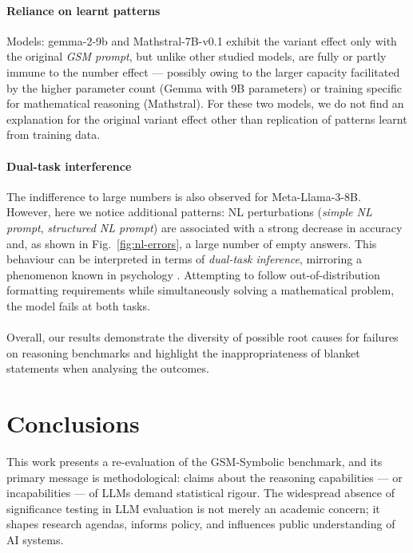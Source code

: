 \documentclass[11pt]{article}
\begin{document}
\paragraph{Reliance on learnt patterns}
Models: gemma-2-9b and Mathstral-7B-v0.1 exhibit the variant effect only with the original \textit{GSM prompt}, but unlike other studied models, are fully or partly immune to the number effect --- possibly owing to the larger capacity facilitated by the higher parameter count (Gemma with 9B parameters) or training specific for mathematical reasoning (Mathstral). For these two models, we do not find an explanation for the original variant effect other than replication of patterns learnt from training data.

\paragraph{Dual-task interference}
The indifference to large numbers is also observed for Meta-Llama-3-8B. However, here we notice additional patterns: NL perturbations (\textit{simple NL prompt}, \textit{structured NL prompt}) are associated with a strong decrease in accuracy and, as shown in Fig.~\ref{fig:nl-errors}, a large number of empty answers. This behaviour can be interpreted in terms of \textit{dual-task inference}, mirroring a phenomenon known in psychology \cite{pashler1994dual}. Attempting to follow out-of-distribution formatting requirements while simultaneously solving a mathematical problem, the model fails at both tasks. 

\paragraph{}Overall, our results demonstrate the diversity of possible root causes for failures on reasoning benchmarks and highlight the inappropriateness of blanket statements when analysing the outcomes. 


\section{Conclusions}
This work presents a re-evaluation of the GSM-Symbolic benchmark, and its primary message is methodological: claims about the reasoning capabilities --- or incapabilities --- of LLMs demand statistical rigour. The widespread absence of significance testing in LLM evaluation is not merely an academic concern; it shapes research agendas, informs policy, and influences public understanding of AI systems.
\end{document}
